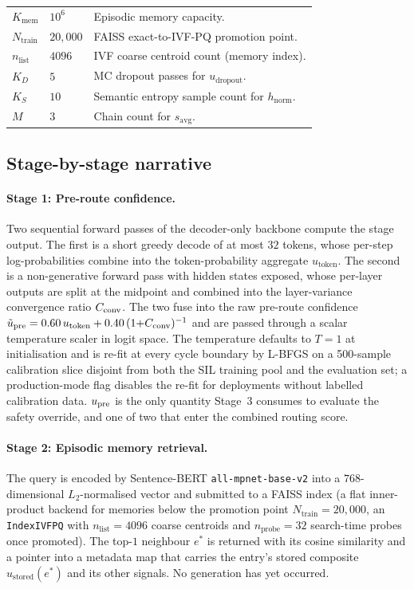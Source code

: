 \begin{table}[tbp]
\begin{tabular}{@{}p{2.2cm}p{2.1cm}p{9.4cm}@{}}
$K_{\text{mem}}$           & $10^{6}$  & Episodic memory capacity. \\
$N_{\text{train}}$         & $20{,}000$ & FAISS exact-to-IVF-PQ promotion point. \\
$n_{\text{list}}$          & $4096$    & IVF coarse centroid count (memory index). \\
$K_D$                      & $5$       & MC dropout passes for $u_{\text{dropout}}$. \\
$K_S$                      & $10$      & Semantic entropy sample count for $h_{\text{norm}}$. \\
$M$                        & $3$       & Chain count for $s_{\text{avg}}$. \\
\bottomrule
\end{tabular}
\end{table}

\subsection{Stage-by-stage narrative}
\label{sec:stage-narrative}

\paragraph{Stage 1: Pre-route confidence.}
Two sequential forward passes of the decoder-only backbone compute the stage output. The first is a short greedy decode of at most $32$ tokens, whose per-step log-probabilities combine into the token-probability aggregate $u_{\text{token}}$. The second is a non-generative forward pass with hidden states exposed, whose per-layer outputs are split at the midpoint and combined into the layer-variance convergence ratio $C_{\text{conv}}$. The two fuse into the raw pre-route confidence $\tilde{u}_{\text{pre}} = 0.60\,u_{\text{token}} + 0.40\,(1{+}C_{\text{conv}})^{-1}$ and are passed through a scalar temperature scaler in logit space. The temperature defaults to $T = 1$ at initialisation and is re-fit at every cycle boundary by L-BFGS on a 500-sample calibration slice disjoint from both the SIL training pool and the evaluation set; a production-mode flag disables the re-fit for deployments without labelled calibration data. $u_{\text{pre}}$ is the only quantity Stage~3 consumes to evaluate the safety override, and one of two that enter the combined routing score.

\paragraph{Stage 2: Episodic memory retrieval.}
The query is encoded by Sentence-BERT \texttt{all-mpnet-base-v2} into a $768$-dimensional $L_{2}$-normalised vector and submitted to a FAISS index (a flat inner-product backend for memories below the promotion point $N_{\text{train}} = 20{,}000$, an \texttt{IndexIVFPQ} with $n_{\text{list}} = 4096$ coarse centroids and $n_{\text{probe}} = 32$ search-time probes once promoted). The top-$1$ neighbour $e^{*}$ is returned with its cosine similarity and a pointer into a metadata map that carries the entry's stored composite $u_{\text{stored}}(e^{*})$ and its other signals. No generation has yet occurred.

